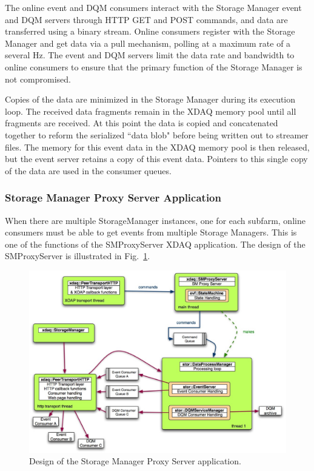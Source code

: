 The online event and DQM consumers interact with the Storage Manager event and
DQM servers through HTTP GET and POST commands, and data are transferred using
a binary stream. Online consumers register with the Storage Manager and get
data via a pull mechanism, polling at a maximum rate of a several Hz. The
event and DQM servers limit the data rate and bandwidth to online consumers to
ensure that the primary function of the Storage Manager is not compromised.

Copies of the data are minimized in the Storage Manager during its execution
loop. The received data fragments remain in the XDAQ memory pool
until all fragments are received. At this point the data is copied and
concatenated together to reform the serialized ``data blob" before being
written out to streamer files. The memory for this event data in the
XDAQ memory pool is
then released, but the event server retains a
copy of this event data. Pointers to this single copy of the data
are used in the consumer queues.


\subsubsection{Storage Manager Proxy Server Application}

When there are multiple StorageManager instances, one for each subfarm, online
consumers must be able to get events from multiple Storage Managers. This is
one of the functions of the SMProxyServer XDAQ application. The design of the
SMProxyServer is illustrated in Fig.~\ref{fig:SMProxyServer_System}.

\begin{figure}[hbtp]
  \begin{center}
    \includegraphics[width=5.5in]{Software/SMProxyServer_System.eps}
    \caption{Design of the Storage Manager Proxy Server application.}
    \label{fig:SMProxyServer_System}
  \end{center}
\end{figure}

